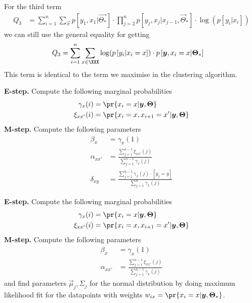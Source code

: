 \documentclass[landscape,footrule]{foils}
\newcommand{\pd}[1]{p\left[#1\right]}
\begin{document}
For the third term
\begin{align*}
Q_3&=\sum_{i=1}^n\sum_{\vec{x}}\pd{y_1,x_1|\vec{\Theta_*}}\cdot\prod_{j=2}^n\pd{y_j,x_j|x_{j-1},\vec{\Theta}_*}\cdot\log(\pd{y_i|x_i})
\end{align*} 
we can still use the general equality for getting
\begin{align*}
Q_3&=\sum_{i=1}^n\sum_{x\in\XXX}\log(\pd{y_i|x_i=x})\cdot\pd{\vec{y},x_i=x|\vec{\Theta}_*} 
\end{align*}
This term is identical to the term we maximise in the clustering algorithm.


\textbf{E-step.} Compute the following marginal probabilities
\begin{align*}
\gamma_{x}(i)&=\pr{x_i=x|\vec{y},\vec{\Theta}}\\
\xi_{xx'}(i)&=\pr{x_i=x, x_{i+1}=x'|\vec{y},\vec{\Theta}}
\end{align*} 
\textbf{M-step.} Compute the following parameters
\begin{align*}
\beta_x&=\gamma_x(1)\\
\alpha_{xx'}&=\frac{\sum_{j=1}^{n-1}\xi_{xx'}(j)}{\sum_{j=1}^{n-1}\gamma_x(j)}\\
\delta_{xy}&=\frac{\sum_{j=1}^{n-1}\gamma_x(j)\cdot[y_j=y]}{\sum_{j=1}^{n}\gamma_x(j)}
\end{align*}


\textbf{E-step.} Compute the following marginal probabilities
\begin{align*}
\gamma_{x}(i)&=\pr{x_i=x|\vec{y},\vec{\Theta}}\\
\xi_{xx'}(i)&=\pr{x_i=x, x_{i+1}=x'|\vec{y},\vec{\Theta}}
\end{align*} 
\textbf{M-step.} Compute the following parameters
\begin{align*}
\beta_x&=\gamma_x(1)\\
\alpha_{xx'}&=\frac{\sum_{j=1}^{n-1}\xi_{xx'}(j)}{\sum_{j=1}^{n-1}\gamma_x(j)}
\end{align*}
and find parameters $\vec{\mu}_j,\Sigma_j$ for the normal distribution  by doing maximum likelihood fit for the datapoints with weights $w_{ix}=\pr{x_i=x|\vec{y},\vec{\Theta}_*}$\enspace. 


\end{document}
